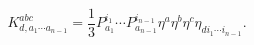 \begin{equation}
K_{d,a_{1}\cdots a_{n-1}}^{abc}=\frac{1}{3}P_{a_{1}}^{i_{1}}\cdots
P_{a_{n-1}}^{i_{n-1}}\eta ^{a}\eta ^{b}\eta ^{c}\eta _{di_{1}\cdots i_{n-1}}.
\label{c24}
\end{equation}

